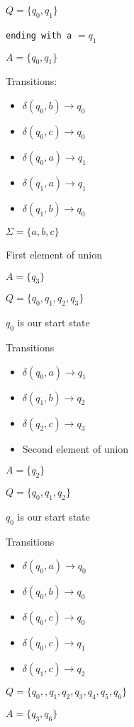 \documentclass{article}
\begin{document}
\(Q = \{q_0, q_1\}\)

\texttt{ending\ with\ a} \(= q_1\)

\(A = \{q_0, q_1\}\)

Transitions: 
\begin{itemize}
    \item \(\delta(q_0, b) \to q_0\)
    \item \(\delta(q_0, c) \to q_0\)
    \item \(\delta(q_0, a) \to q_1\)
    \item \(\delta(q_1, a) \to q_1\)
    \item \(\delta(q_1, b) \to q_0\)
\end{itemize}



\(\Sigma = \{a,b,c\}\)

First element of union

\(A = \{q_3\}\)

\(Q = \{q_0, q_1, q_2, q_3\}\)

\(q_0\) is our start state

Transitions 
\begin{itemize}
    \item \(\delta(q_0, a) \to q_1\)
    \item \(\delta(q_1, b) \to q_2\)
    \item \(\delta(q_2, c) \to q_3\)
    \item Second element of union
\end{itemize}


\(A = \{q_2\}\)

\(Q = \{q_0, q_1, q_2\}\)

\(q_0\) is our start state

Transitions
\begin{itemize}
    \item \(\delta(q_0, a) \to q_0\)
    \item \(\delta(q_0, b) \to q_0\)
    \item \(\delta(q_0, c) \to q_0\)
    \item \(\delta(q_0, c) \to q_1\)
    \item \(\delta(q_1, c) \to q_2\)
\end{itemize}



\(Q = \{q_0, , q_1, q_2,q_3,q_4,q_5,q_6\}\)

\(A = \{q_3, q_6\}\)
\end{document}

